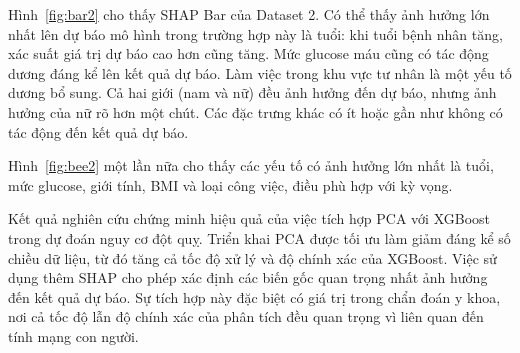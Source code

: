 
\FloatBarrier

Hình~\ref{fig:bar2} cho thấy SHAP Bar của Dataset 2. Có thể thấy ảnh hưởng lớn nhất lên dự báo mô hình trong trường hợp này là tuổi: khi tuổi bệnh nhân tăng, xác suất giá trị dự báo cao hơn cũng tăng. Mức glucose máu cũng có tác động dương đáng kể lên kết quả dự báo. Làm việc trong khu vực tư nhân là một yếu tố dương bổ sung. Cả hai giới (nam và nữ) đều ảnh hưởng đến dự báo, nhưng ảnh hưởng của nữ rõ hơn một chút. Các đặc trưng khác có ít hoặc gần như không có tác động đến kết quả dự báo.


Hình~\ref{fig:bee2} một lần nữa cho thấy các yếu tố có ảnh hưởng lớn nhất là tuổi, mức glucose, giới tính, BMI và loại công việc, điều phù hợp với kỳ vọng.


Kết quả nghiên cứu chứng minh hiệu quả của việc tích hợp PCA với XGBoost trong dự đoán nguy cơ đột quỵ. Triển khai PCA được tối ưu làm giảm đáng kể số chiều dữ liệu, từ đó tăng cả tốc độ xử lý và độ chính xác của XGBoost. Việc sử dụng thêm SHAP cho phép xác định các biến gốc quan trọng nhất ảnh hưởng đến kết quả dự báo. Sự tích hợp này đặc biệt có giá trị trong chẩn đoán y khoa, nơi cả tốc độ lẫn độ chính xác của phân tích đều quan trọng vì liên quan đến tính mạng con người.
